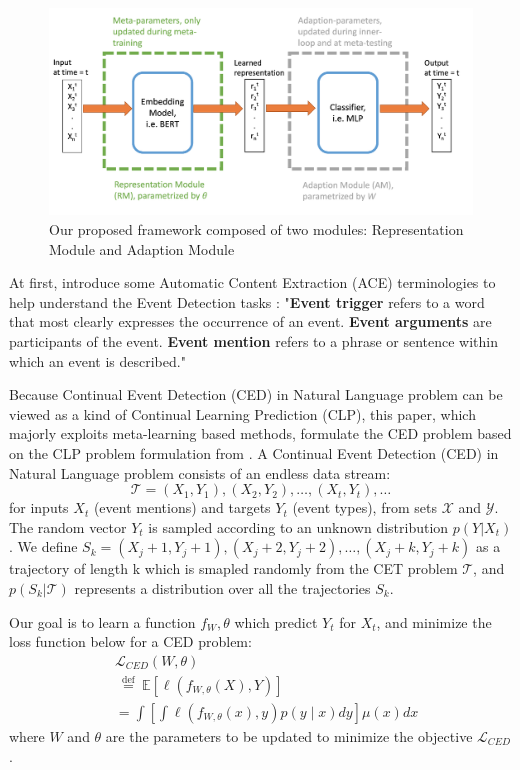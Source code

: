
\begin{figure}[ht]
\centering
    \includegraphics[scale=0.6]{imgs/framework.jpg}
    \caption{Our proposed framework composed of two modules: Representation Module and Adaption Module}
    \label{img:1}
\end{figure}


At first, introduce some Automatic Content Extraction (ACE) terminologies to help understand the Event Detection tasks \citep{cao2020incremental}: "\textbf{Event trigger} refers to a word that most clearly expresses the occurrence of an event. \textbf{Event arguments} are participants of the event. \textbf{Event mention} refers to a phrase or sentence within which an event is described."

Because Continual Event Detection (CED) in Natural Language problem can be viewed as a kind of Continual Learning Prediction (CLP), this paper, which majorly exploits meta-learning based methods, formulate the CED problem based on the CLP problem formulation from \citet{javed2019meta}.
A Continual Event Detection (CED) in Natural Language problem consists of an endless data stream:
\[\mathcal{T} = (X_1, Y_1), (X_2, Y_2), \dots, (X_t, Y_t), \dots\]
for inputs $X_t$ (event mentions) and targets $Y_t$ (event types), from sets $\mathcal{X}$ and $\mathcal{Y}$. The random vector $Y_t$ is sampled
according to an unknown distribution $p(Y|X_t)$. We define $S_k = (X_j+1, Y_j+1), (X_j+2, Y_j+2), \dots, (X_j+k, Y_j+k)$ as a trajectory of length k which is smapled randomly from the CET problem $\mathcal{T}$, and $p(S_k|\mathcal{T})$ represents a distribution over all the trajectories $S_k$.

Our goal is to learn a function $f_W,\theta$ which predict $Y_t$ for $X_t$, and minimize the loss function below for a CED problem:
\begin{equation}
    \begin{split}
    &\mathcal{L}_{C E D}(W, \theta)  \\
    &\stackrel{\text { def }}{=}  \mathbb{E}\left[\ell\left(f_{W, \theta}(X), Y\right)\right] \\ 
    & =\int\left[\int \ell\left(f_{W, \theta}(x), y\right) p(y \mid x) d y\right] \mu(x) d x
    \end{split}
\end{equation}
where $W$ and $\theta$ are the parameters to be updated to minimize the objective $\mathcal{L}_{C E D}$.
